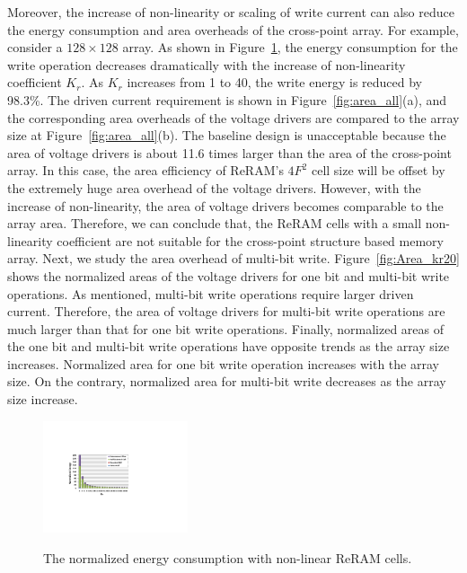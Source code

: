 Moreover, the increase of non-linearity or scaling of write current can
also reduce the energy consumption and area overheads of the cross-point
array. For example, consider a $128 \times 128$ array. As shown in
Figure~\ref{fig:non_linear_energy}, the energy consumption for the write
operation decreases dramatically with the increase of non-linearity
coefficient $K_r$. As $K_r$ increases from 1 to 40, the write energy is
reduced by 98.3\%. The driven current requirement is shown in
Figure~\ref{fig:area_all}(a), and the corresponding area overheads of the
voltage drivers are compared to the array size at
Figure~\ref{fig:area_all}(b). The baseline design is unacceptable because
the area of voltage drivers is about 11.6 times larger than the area of
the cross-point array. In this case, the area efficiency of ReRAM's $4F^2$
cell size will be offset by the extremely huge area overhead of the
voltage drivers. However, with the increase of non-linearity, the area of
voltage drivers becomes comparable to the array area. Therefore, we can
conclude that, the ReRAM cells with a small non-linearity coefficient are
not suitable for the cross-point structure based memory array. Next, we
study the area overhead of multi-bit write. Figure~\ref{fig:Area_kr20}
shows the normalized areas of the voltage drivers for one bit and
multi-bit write operations. As mentioned, multi-bit write operations
require larger driven current. Therefore, the area of voltage drivers for
multi-bit write operations are much larger than that for one bit write
operations. Finally, normalized areas of the one bit and multi-bit write
operations have opposite trends as the array size increases. Normalized
area for one bit write operation increases with the array size. On the
contrary, normalized area for multi-bit write decreases as the array size
increase.

\begin{figure}%
\centering
  \includegraphics[width=0.38\textwidth]{./figures/non_linear_energy.pdf}\\
  \caption{The normalized energy consumption with non-linear ReRAM cells.}\label{fig:non_linear_energy}
\end{figure}

